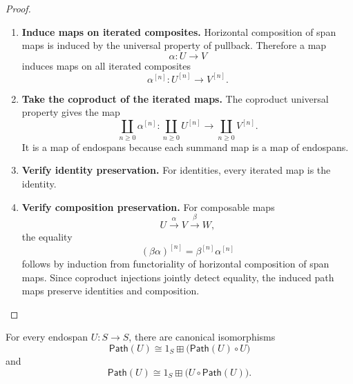 \begin{proof}
\begin{enumerate}
  \item \textbf{Induce maps on iterated composites.}
  Horizontal composition of span maps is induced by the universal property of
  pullback. Therefore a map
  \[
    \alpha:U\to V
  \]
  induces maps on all iterated composites
  \[
    \alpha^{[n]}:U^{[n]}\to V^{[n]}.
  \]

  \item \textbf{Take the coproduct of the iterated maps.}
  The coproduct universal property gives the map
  \[
    \coprod_{n\geq 0}\alpha^{[n]}:
    \coprod_{n\geq 0}U^{[n]}
    \longrightarrow
    \coprod_{n\geq 0}V^{[n]}.
  \]
  It is a map of endospans because each summand map is a map of endospans.

  \item \textbf{Verify identity preservation.}
  For identities, every iterated map is the identity.

  \item \textbf{Verify composition preservation.}
  For composable maps
  \[
    U\xrightarrow{\alpha}V\xrightarrow{\beta}W,
  \]
  the equality
  \[
    (\beta\alpha)^{[n]}=\beta^{[n]}\alpha^{[n]}
  \]
  follows by induction from functoriality of horizontal composition of span
  maps. Since coproduct injections jointly detect equality, the induced path
  maps preserve identities and composition.
\end{enumerate}
\end{proof}

\begin{lemma}
\label{lem:two-sided-path-decomposition-feedback}
For every endospan \(U:S\to S\), there are canonical isomorphisms
\[
  \mathsf{Path}(U)
  \cong
  1_S\boxplus\bigl(\mathsf{Path}(U)\circ U\bigr)
\]
and
\[
  \mathsf{Path}(U)
  \cong
  1_S\boxplus\bigl(U\circ\mathsf{Path}(U)\bigr).
\]
\end{lemma}

